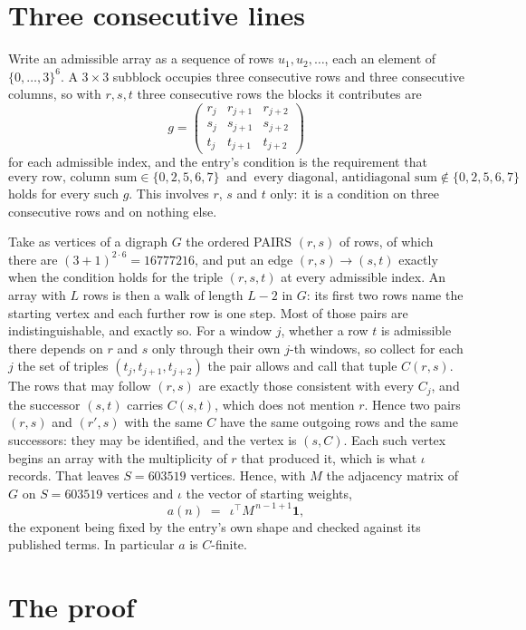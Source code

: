 \documentclass[11pt,a4paper]{article}
\theoremstyle{plain}
\theoremstyle{definition}
\begin{document}
\section{Three consecutive lines}

Write an admissible array as a sequence of rows $u_1,u_2,\dots$, each an element of
$\{0,\dots,3\}^{6}$. A $3\times3$ subblock occupies three consecutive rows and
three consecutive columns, so with $r,s,t$ three consecutive rows the blocks it
contributes are
\[
g=\begin{pmatrix}r_j&r_{j+1}&r_{j+2}\\ s_j&s_{j+1}&s_{j+2}\\ t_j&t_{j+1}&t_{j+2}\end{pmatrix}
\]
for each admissible index, and the entry's condition is the requirement that
\[
\text{every row, column sum} \in \{0,2,5,6,7\}\ \text{ and }\ \text{every diagonal, antidiagonal sum} \notin \{0,2,5,6,7\}
\]
holds for every such $g$. This involves $r$, $s$ and $t$ only: it is a condition on
three consecutive rows and on nothing else.

Take as vertices of a digraph $G$ the ordered PAIRS $(r,s)$ of rows, of which there are
$(3+1)^{2\cdot6}=16777216$, and put an edge $(r,s)\to(s,t)$ exactly when the condition
holds for the triple $(r,s,t)$ at every admissible index. An array with $L$ rows is then a
walk of length $L-2$ in $G$: its first two rows name the starting vertex and each further
row is one step. Most of those pairs are indistinguishable, and exactly so. For a window $j$, whether a row $t$ is admissible there depends on $r$ and $s$ only through their own $j$-th windows, so collect for each $j$ the set of triples $(t_j,t_{j+1},t_{j+2})$ the pair allows and call that tuple $C(r,s)$. The rows that may follow $(r,s)$ are exactly those consistent with every $C_j$, and the successor $(s,t)$ carries $C(s,t)$, which does not mention $r$. Hence two pairs $(r,s)$ and $(r',s)$ with the same $C$ have the same outgoing rows and the same successors: they may be identified, and the vertex is $(s,C)$. Each such vertex begins an array with the multiplicity of $r$ that produced it, which is what $\iota$ records. That leaves $S=603519$ vertices. Hence, with $M$ the adjacency matrix of $G$ on $S=603519$ vertices and
$\iota$ the vector of starting weights,
\[
a(n)\;=\;\,\iota^{\!\top}M^{\,n-1+1}\mathbf{1},
\]
the exponent being fixed by the entry's own shape and checked against its published terms.
In particular $a$ is $C$-finite.

\section{The proof}
\end{document}
